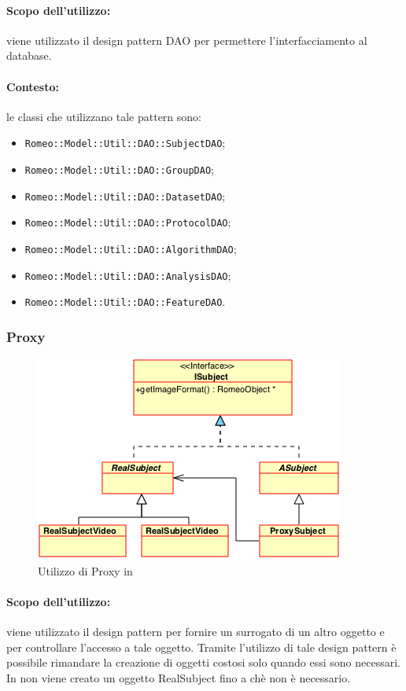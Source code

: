 \paragraph{Scopo dell'utilizzo:} viene utilizzato il design pattern\glossario{} DAO per permettere l'interfacciamento al database.
\paragraph{Contesto:} le classi che utilizzano tale pattern sono:
\begin{itemize}
	\item \verb!Romeo::Model::Util::DAO::SubjectDAO!;
	\item \verb!Romeo::Model::Util::DAO::GroupDAO!;
	\item \verb!Romeo::Model::Util::DAO::DatasetDAO!;
	\item \verb!Romeo::Model::Util::DAO::ProtocolDAO!;
	\item \verb!Romeo::Model::Util::DAO::AlgorithmDAO!;
	\item \verb!Romeo::Model::Util::DAO::AnalysisDAO!;
	\item \verb!Romeo::Model::Util::DAO::FeatureDAO!.
\end{itemize}
\pagebreak
\subsubsection{Proxy}
\label{dp_proxy}
	\begin{figure}[!h]
		\includegraphics[width=0.7\linewidth]{./Content/Immagini/Proxy.png}
		\caption{Utilizzo di Proxy in \project{}}
		\label{proxy_romeo}
	\end{figure}
	\paragraph{Scopo dell'utilizzo:} viene utilizzato il design pattern\g{} per fornire un surrogato di un altro oggetto e per controllare l'accesso a tale oggetto.
	Tramite l'utilizzo di tale design pattern\g{} è possibile rimandare la creazione di oggetti costosi solo quando essi sono necessari. In \project{} non viene creato un oggetto RealSubject fino a chè non è necessario.
